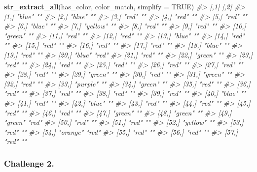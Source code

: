 \documentclass[
]{book}
\newenvironment{Shaded}{\begin{snugshade}}{\end{snugshade}}
\newcommand{\CommentTok}[1]{\textcolor[rgb]{0.56,0.35,0.01}{\textit{#1}}}
\newcommand{\DataTypeTok}[1]{\textcolor[rgb]{0.13,0.29,0.53}{#1}}
\newcommand{\KeywordTok}[1]{\textcolor[rgb]{0.13,0.29,0.53}{\textbf{#1}}}
\newcommand{\NormalTok}[1]{#1}
\newcommand{\OtherTok}[1]{\textcolor[rgb]{0.56,0.35,0.01}{#1}}
\begin{document}
\begin{Shaded}
\begin{Highlighting}[]
\KeywordTok{str_extract_all}\NormalTok{(has_color, color_match, }\DataTypeTok{simplify =} \OtherTok{TRUE}\NormalTok{)}
\CommentTok{#>       [,1]     [,2] }
\CommentTok{#>  [1,] "blue"   ""   }
\CommentTok{#>  [2,] "blue"   ""   }
\CommentTok{#>  [3,] "red"    ""   }
\CommentTok{#>  [4,] "red"    ""   }
\CommentTok{#>  [5,] "red"    ""   }
\CommentTok{#>  [6,] "blue"   ""   }
\CommentTok{#>  [7,] "yellow" ""   }
\CommentTok{#>  [8,] "red"    ""   }
\CommentTok{#>  [9,] "red"    ""   }
\CommentTok{#> [10,] "green"  ""   }
\CommentTok{#> [11,] "red"    ""   }
\CommentTok{#> [12,] "red"    ""   }
\CommentTok{#> [13,] "blue"   ""   }
\CommentTok{#> [14,] "red"    ""   }
\CommentTok{#> [15,] "red"    ""   }
\CommentTok{#> [16,] "red"    ""   }
\CommentTok{#> [17,] "red"    ""   }
\CommentTok{#> [18,] "blue"   ""   }
\CommentTok{#> [19,] "red"    ""   }
\CommentTok{#> [20,] "blue"   "red"}
\CommentTok{#> [21,] "red"    ""   }
\CommentTok{#> [22,] "green"  ""   }
\CommentTok{#> [23,] "red"    ""   }
\CommentTok{#> [24,] "red"    ""   }
\CommentTok{#> [25,] "red"    ""   }
\CommentTok{#> [26,] "red"    ""   }
\CommentTok{#> [27,] "red"    ""   }
\CommentTok{#> [28,] "red"    ""   }
\CommentTok{#> [29,] "green"  ""   }
\CommentTok{#> [30,] "red"    ""   }
\CommentTok{#> [31,] "green"  ""   }
\CommentTok{#> [32,] "red"    ""   }
\CommentTok{#> [33,] "purple" ""   }
\CommentTok{#> [34,] "green"  ""   }
\CommentTok{#> [35,] "red"    ""   }
\CommentTok{#> [36,] "red"    ""   }
\CommentTok{#> [37,] "red"    ""   }
\CommentTok{#> [38,] "red"    ""   }
\CommentTok{#> [39,] "red"    ""   }
\CommentTok{#> [40,] "blue"   ""   }
\CommentTok{#> [41,] "red"    ""   }
\CommentTok{#> [42,] "blue"   ""   }
\CommentTok{#> [43,] "red"    ""   }
\CommentTok{#> [44,] "red"    ""   }
\CommentTok{#> [45,] "red"    ""   }
\CommentTok{#> [46,] "red"    ""   }
\CommentTok{#> [47,] "green"  ""   }
\CommentTok{#> [48,] "green"  ""   }
\CommentTok{#> [49,] "green"  "red"}
\CommentTok{#> [50,] "red"    ""   }
\CommentTok{#> [51,] "red"    ""   }
\CommentTok{#> [52,] "yellow" ""   }
\CommentTok{#> [53,] "red"    ""   }
\CommentTok{#> [54,] "orange" "red"}
\CommentTok{#> [55,] "red"    ""   }
\CommentTok{#> [56,] "red"    ""   }
\CommentTok{#> [57,] "red"    ""}
\end{Highlighting}
\end{Shaded}

\hypertarget{challenge-2.-11}{%
\subsubsection*{Challenge 2.}\label{challenge-2.-11}}
\end{document}
